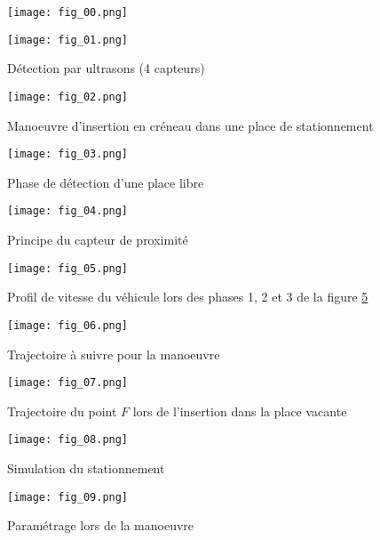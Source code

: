 
\begin{figure}[H]
\centering
\texttt{[image: fig\_00.png]}
\end{figure}


\begin{figure}[H]
\centering
\texttt{[image: fig\_01.png]}
\caption{Détection par ultrasons (4 capteurs) \label{fig_01}}
\end{figure}


\begin{figure}[H]
\centering
\texttt{[image: fig\_02.png]}
\caption{Manoeuvre d’insertion en créneau dans une place de stationnement \label{fig_02}}
\end{figure}


\begin{figure}[H]
\centering
\texttt{[image: fig\_03.png]}
\caption{Phase de détection d’une place libre \label{fig_03}}
\end{figure}


\begin{figure}[H]
\centering
\texttt{[image: fig\_04.png]}
\caption{Principe du capteur de proximité \label{fig_04}}
\end{figure}


\begin{figure}[H]
\centering
\texttt{[image: fig\_05.png]}
\caption{Profil de vitesse du véhicule lors des phases 1, 2 et 3 de la figure \ref{fig_05} \label{fig_05}}
\end{figure}


\begin{figure}[H]
\centering
\texttt{[image: fig\_06.png]}
\caption{Trajectoire à suivre pour la manoeuvre \label{fig_06}}
\end{figure}


\begin{figure}[H]
\centering
\texttt{[image: fig\_07.png]}
\caption{Trajectoire du point $F$ lors de l’insertion dans la place vacante \label{fig_07}}
\end{figure}


\begin{figure}[H]
\centering
\texttt{[image: fig\_08.png]}
\caption{Simulation du stationnement \label{fig_08}}
\end{figure}


\begin{figure}[H]
\centering
\texttt{[image: fig\_09.png]}
\caption{Paramétrage lors de la manoeuvre \label{fig_09}}
\end{figure}


